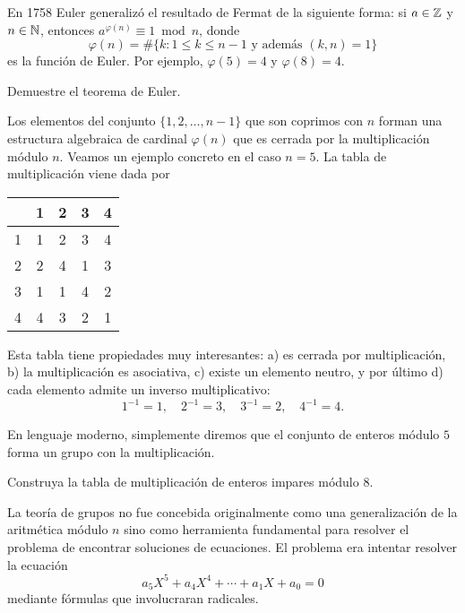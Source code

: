 
En 1758 Euler generalizó el resultado de Fermat de la siguiente forma: si $a\in\mathbb{Z}$ y
$n\in\mathbb{N}$, entonces $a^{\varphi(n)}\equiv 1\bmod n$, donde 
\[
	\varphi(n)=\#\{k:1\leq k\leq n-1\text{ y además }(k,n)=1\}
\]
es la función de Euler. Por ejemplo, $\varphi(5)=4$ y $\varphi(8)=4$.

\begin{exercise}
	Demuestre el teorema de Euler.
\end{exercise}

Los elementos del conjunto $\{1,2,\dots,n-1\}$ que son coprimos con $n$ forman una estructura
algebraica de cardinal $\varphi(n)$ que es cerrada por la multiplicación módulo $n$. Veamos un ejemplo concreto en
el caso $n=5$. La tabla de multiplicación viene dada por 
\begin{table}
\begin{center}
	\begin{tabular}{c|cccc}
	  & 1 & 2 & 3 & 4 \\
	  \hline
	1 & 1 & 2 & 3 & 4 \\
	2 & 2 & 4 & 1 & 3 \\
	3 & 1 & 1 & 4 & 2 \\
	4 & 4 & 3 & 2 & 1
\end{tabular}
\end{center}
\end{table}

Esta tabla tiene propiedades muy interesantes: a) es cerrada por
multiplicación, b) la multiplicación es asociativa, c) existe un elemento
neutro, y por último d) cada elemento admite un inverso multiplicativo:
\[
	1^{-1}=1,\quad
	2^{-1}=3,\quad
	3^{-1}=2,\quad
	4^{-1}=4.
\]

En lenguaje moderno, simplemente diremos que el conjunto de enteros módulo $5$
forma un grupo con la multiplicación.

\begin{exercise}
	Construya la tabla de multiplicación de enteros impares módulo 8.
\end{exercise}

La teoría de grupos no fue concebida originalmente como una generalización de
la aritmética módulo $n$ sino como herramienta fundamental para resolver el
problema de encontrar soluciones de ecuaciones. El problema era intentar
resolver la ecuación
\[
	a_5X^5+a_4X^4+\cdots+a_1X+a_0=0
\]
mediante fórmulas que involucraran radicales. 

